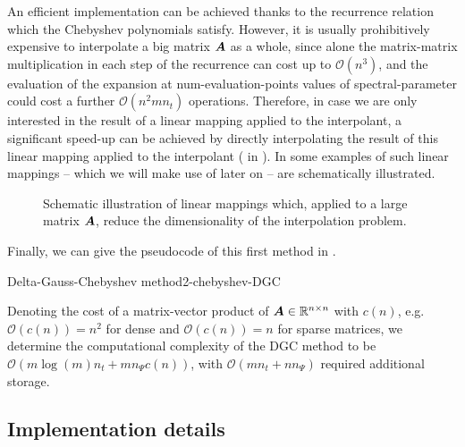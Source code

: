 An efficient implementation can be achieved thanks to the recurrence relation
 which the Chebyshev polynomials satisfy.
However, it is usually prohibitively expensive to interpolate a big matrix
$\boldsymbol{A}$ as a whole, since alone the matrix-matrix multiplication in each step
of the recurrence can cost up to $\mathcal{O}(n^3)$, and the evaluation
of the expansion at \gls{num-evaluation-points} values of \gls{spectral-parameter} could
cost a further $\mathcal{O}(n^2 m n_t)$ operations. Therefore, in case we are only interested
in the result of a linear mapping applied to the interpolant, a significant speed-up can be
achieved by directly interpolating the result of this linear mapping applied to
the interpolant ( in ).
In  some examples
of such linear mappings -- which we will make use of later on -- are schematically
illustrated.\\
\begin{figure}[ht]
    \centering
    
    \caption{Schematic illustration of linear mappings which, applied to a large
        matrix $\boldsymbol{A}$, reduce the dimensionality of the interpolation problem.}
    \label{fig:2-chebyshev-sketched-interpolation}
\end{figure}

Finally, we can give the pseudocode
of this first method in .
\begin{algo}{Delta-Gauss-Chebyshev method}{2-chebyshev-DGC}
    
\end{algo}

Denoting the cost of a matrix-vector product of $\boldsymbol{A} \in \mathbb{R}^{n \times n}$
with $c(n)$, e.g. $\mathcal{O}(c(n)) = n^2$ for dense and
$\mathcal{O}(c(n)) = n$ for sparse matrices, we determine the computational
complexity of the \gls{DGC} method to be $\mathcal{O}(m \log(m) n_t + m n_{\Psi} c(n))$,
with $\mathcal{O}(m n_t + n n_{\Psi})$ required additional storage.


\subsection{Implementation details}
\label{subsec:2-chebyshev-implementation-details}

